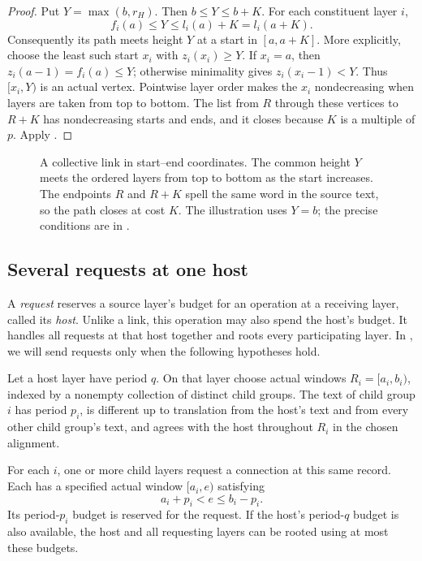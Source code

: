 \begin{proof}
Put $Y=\max(b,r_H)$. Then $b\le Y\le b+K$. For each constituent layer $i$,
\[
f_i(a)\le Y\le l_i(a)+K=l_i(a+K).
\]
Consequently its path meets height $Y$ at a start in $[a,a+K]$. More explicitly, choose the least such start $x_i$ with $z_i(x_i)\ge Y$. If $x_i=a$, then $z_i(a-1)=f_i(a)\le Y$; otherwise minimality gives $z_i(x_i-1)<Y$. Thus $[x_i,Y)$ is an actual vertex. Pointwise layer order makes the $x_i$ nondecreasing when layers are taken from top to bottom. The list from $R$ through these vertices to $R+K$ has nondecreasing starts and ends, and it closes because $K$ is a multiple of $p$. Apply .
\end{proof}

\begin{figure}[tbp]
\centering

\caption{A collective link in start--end coordinates. The common height $Y$ meets the ordered layers from top to bottom as the start increases. The endpoints $R$ and $R+K$ spell the same word in the source text, so the path closes at cost $K$. The illustration uses $Y=b$; the precise conditions are in .}
\label{fig:collective}
\end{figure}

\subsection{Several requests at one host}

A \emph{request} reserves a source layer's budget for an operation at a receiving layer, called its \emph{host}. Unlike a link, this operation may also spend the host's budget. It handles all requests at that host together and roots every participating layer. In , we will send requests only when the following hypotheses hold.

\begin{lemma}\label{lem:host}
Let a host layer have period $q$. On that layer choose actual windows $R_i=[a_i,b_i)$, indexed by a nonempty collection of distinct child groups. The text of child group $i$ has period $p_i$, is different up to translation from the host's text and from every other child group's text, and agrees with the host throughout $R_i$ in the chosen alignment.

For each $i$, one or more child layers request a connection at this same record. Each has a specified actual window $[a_i,e)$ satisfying
\begin{equation}\label{eq:request-condition}
a_i+p_i<e\le b_i-p_i.
\end{equation}
Its period-$p_i$ budget is reserved for the request. If the host's period-$q$ budget is also available, the host and all requesting layers can be rooted using at most these budgets.
\end{lemma}


